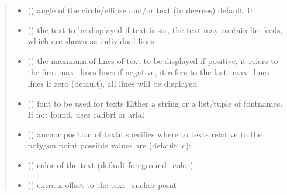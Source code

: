 \documentclass[letterpaper,10pt,english]{sphinxmanual}
\begin{document}
\begin{fulllineitems}
\begin{quote}
\begin{description}
\begin{itemize}
\item {} 
 () \textendash{} angle of the circle/ellipse and/or text (in degrees) 
default: 0

\item {} 
 (\sphinxstyleliteralemphasis{\sphinxupquote{, }}) \textendash{} the text to be displayed 
if text is str, the text may contain linefeeds, which are shown as individual lines

\item {} 
 () \textendash{} the maximum of lines of text to be displayed 
if positive, it refers to the first max\_lines lines 
if negative, it refers to the last -max\_lines lines 
if zero (default), all lines will be displayed

\item {} 
 () \textendash{} font to be used for texts 
Either a string or a list/tuple of fontnames.
If not found, uses calibri or arial

\item {} 
 () \textendash{} anchor position of text\textbar{}n\textbar{}
specifies where to texts relative to the polygon
point 
possible values are (default: c): 

\item {} 
 () \textendash{} color of the text (default foreground\_color)

\item {} 
 () \textendash{} extra x offset to the text\_anchor point


\end{itemize}
\end{description}
\end{quote}
\end{fulllineitems}
\end{document}
